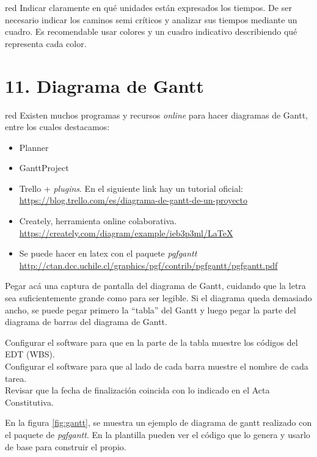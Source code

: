 \documentclass[
11pt, %
]{charter}
\begin{document}
{\begin{consigna}{red}
Indicar claramente en qué unidades están expresados los tiempos.
De ser necesario indicar los caminos semi críticos y analizar sus tiempos mediante un cuadro.
Es recomendable usar colores y un cuadro indicativo describiendo qué representa cada color.

\end{consigna}

\section{11. Diagrama de Gantt}
\label{sec:gantt}

\begin{consigna}{red}
Existen muchos programas y recursos \textit{online} para hacer diagramas de Gantt, entre los cuales destacamos:

\begin{itemize}
\item Planner
\item GanttProject
\item Trello + \textit{plugins}. En el siguiente link hay un tutorial oficial: \\ \url{https://blog.trello.com/es/diagrama-de-gantt-de-un-proyecto}
\item Creately, herramienta online colaborativa. \\\url{https://creately.com/diagram/example/ieb3p3ml/LaTeX}
\item Se puede hacer en latex con el paquete \textit{pgfgantt}\\ \url{http://ctan.dcc.uchile.cl/graphics/pgf/contrib/pgfgantt/pgfgantt.pdf}
\end{itemize}

Pegar acá una captura de pantalla del diagrama de Gantt, cuidando que la letra sea suficientemente grande como para ser legible. 
Si el diagrama queda demasiado ancho, se puede pegar primero la ``tabla'' del Gantt y luego pegar la parte del diagrama de barras del diagrama de Gantt.

Configurar el software para que en la parte de la tabla muestre los códigos del EDT (WBS).\\
Configurar el software para que al lado de cada barra muestre el nombre de cada tarea.\\
Revisar que la fecha de finalización coincida con lo indicado en el Acta Constitutiva.

En la figura \ref{fig:gantt}, se muestra un ejemplo de diagrama de gantt realizado con el paquete de \textit{pgfgantt}. 
En la plantilla pueden ver el código que lo genera y usarlo de base para construir el propio.


\end{consigna}}
\end{document}
